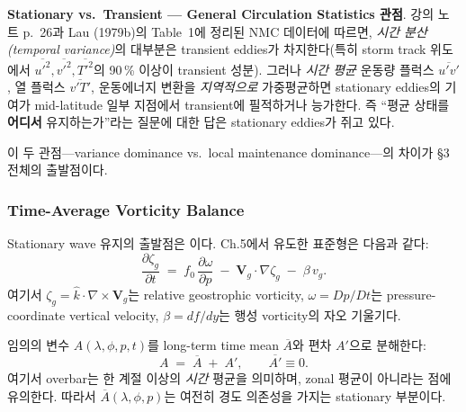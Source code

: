 
\begin{hisublock}
\textbf{Stationary vs.\ Transient — General Circulation Statistics 관점}.
강의 노트 p.~26과 Lau (1979b)의 Table~1에 정리된 NMC 데이터에 따르면,
\emph{시간 분산(temporal variance)}의 대부분은 transient eddies가 차지한다(특히 storm track 위도에서
$\overline{u'^2}, \overline{v'^2}, \overline{T'^2}$의 90\,\% 이상이 transient 성분).
그러나 \emph{시간 평균} 운동량 플럭스 $\overline{u'v'}$, 열 플럭스 $\overline{v'T'}$,
운동에너지 변환을 \emph{지역적으로} 가중평균하면 stationary eddies의 기여가
mid-latitude 일부 지점에서 transient에 필적하거나 능가한다.
즉 ``평균 상태를 \textbf{어디서} 유지하는가''라는 질문에 대한 답은 stationary eddies가 쥐고 있다.

이 두 관점---variance dominance vs.\ local maintenance dominance---의 차이가
§3 전체의 출발점이다.
\end{hisublock}

\subsubsection{Time-Average Vorticity Balance}

Stationary wave 유지의 출발점은 이다.
Ch.5에서 유도한 표준형은 다음과 같다:
\begin{equation}\label{eq:ch06_sw_qgvort}
  \frac{\partial \zeta_g}{\partial t}
  \;=\; f_0\,\frac{\partial \omega}{\partial p}
       \;-\; \mathbf{V}_g\!\cdot\!\nabla \zeta_g
       \;-\; \beta\, v_g .
\end{equation}
여기서 $\zeta_g = \hat{k}\!\cdot\!\nabla\times \mathbf{V}_g$는 relative geostrophic vorticity,
$\omega = Dp/Dt$는 pressure-coordinate vertical velocity,
$\beta = df/dy$는 행성 vorticity의 자오 기울기다.

\begin{definition}\label{def:ch06_sw_reynolds}
임의의 변수 $A(\lambda,\phi,p,t)$를 long-term time mean $\overline{A}$와 편차 $A'$으로 분해한다:
\begin{equation}\label{eq:ch06_sw_decomp}
  A \;=\; \overline{A} \;+\; A',\qquad \overline{A'} \equiv 0 .
\end{equation}
여기서 overbar는 한 계절 이상의 \emph{시간} 평균을 의미하며, zonal 평균이 아니라는 점에 유의한다.
따라서 $\overline{A}(\lambda,\phi,p)$는 여전히 경도 의존성을 가지는 stationary 부분이다.
\end{definition}

